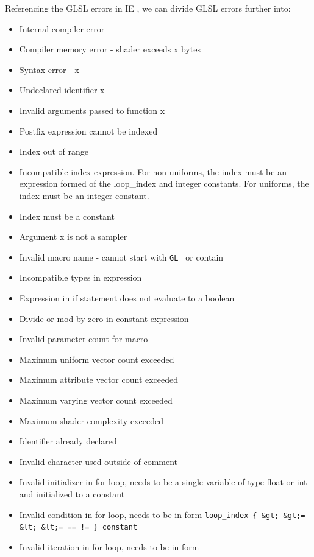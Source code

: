 \documentclass[]{article}
\begin{document}
Referencing the GLSL errors in IE \cite{glerrormsdn}, we can divide GLSL
errors further into:

\begin{itemize}
\itemsep1pt\parskip0pt
\item
  Internal compiler error
\item
  Compiler memory error - shader exceeds x bytes
\item
  Syntax error - x
\item
  Undeclared identifier x
\item
  Invalid arguments passed to function x
\item
  Postfix expression cannot be indexed
\item
  Index out of range
\item
  Incompatible index expression. For non-uniforms, the index must be an
  expression formed of the loop\_index and integer constants. For
  uniforms, the index must be an integer constant.
\item
  Index must be a constant
\item
  Argument x is not a sampler
\item
  Invalid macro name - cannot start with \texttt{GL\_} or contain
  \texttt{\_\_}
\item
  Incompatible types in expression
\item
  Expression in if statement does not evaluate to a boolean
\item
  Divide or mod by zero in constant expression
\item
  Invalid parameter count for macro
\item
  Maximum uniform vector count exceeded
\item
  Maximum attribute vector count exceeded
\item
  Maximum varying vector count exceeded
\item
  Maximum shader complexity exceeded
\item
  Identifier already declared
\item
  Invalid character used outside of comment
\item
  Invalid initializer in for loop, needs to be a single variable of type
  float or int and initialized to a constant
\item
  Invalid condition in for loop, needs to be in form
  \texttt{loop\_index \{ \&gt; \textbar{} \&gt;= \textbar{} \&lt; \textbar{} \&lt;= \textbar{} == \textbar{} != \} constant}
\item
  Invalid iteration in for loop, needs to be in form

\end{itemize}
\end{document}
